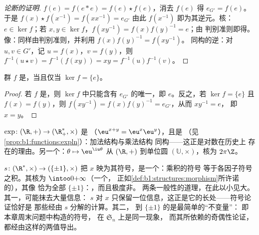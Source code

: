 \begin{proof}[论断的证明]
$f(e) = f(e * e) = f(e)\star f(e)$，消去 $f(e)$ 得
$e_{G'} = f(e)$。于是 $f(x)\star f(x^{-1}) = f(x x^{-1}) = e_{G'}$
由此 $f(x^{-1})$ 即为其逆元。核：$e \in \ker f$；若
$x, y \in \ker f$，$f(xy^{-1}) = f(x)f(y)^{-1} = e$；由
判别准则即得。像：同样由判别准则，并利用 $f(x)f(y)^{-1} = f(xy^{-1})$。
同构的逆：对 $u, v \in G'$，记 $u = f(x)$，$v =
f(y)$，则 $f^{-1}(u \star v) = f^{-1}(f(xy)) = xy =
f^{-1}(u) f^{-1}(v)$。
\end{proof}

\begin{proposition}[借助核判定单射性]\label{prop:b1:structures:kernel}
群 $f$ 是，当且仅当 $\ker f =
\{e\}$。
\end{proposition}

\begin{proof}
若 $f$ 是，则 $\ker f$ 中只能含有
$e_{G'}$ 的唯一，即 $e$。反之，若 $\ker f = \{e\}$ 且 $f(x) =
f(y)$，则 $f(xy^{-1}) = f(x) f(y)^{-1} = e_{G'}$，从而 $xy^{-1} = e$，
即 $x = y$。
\end{proof}

\begin{example}\label{ex:b1:structures:expmorphism}
$\exp \colon (\R, +) \to (\R_+^*, \times)$ 是
（$\eu^{x+y} = \eu^x \eu^y$），且是
（见\cref{prop:b1:functions:expln}）：加法结构与乘法结构
同构——这正是对数在历史上
存在的理由。另一个：$\theta \mapsto \eu^{\iu\theta}$ 从
$(\R, +)$ 到单位圆 $(\mathbb{U}, \times)$，核为
$2\pi\Z$。
\end{example}

\begin{example}[符号同态]\label{ex:b1:structures:signmorphism}
 $s \colon (\R^*, \times) \to (\{\pm1\}, \times)$ 把
$x$ 映为其符号，是一个：乘积的符号
等于各因子符号之积。其核为 $\intoo0{+\infty}$（一个，
正如\cref{def:b1:structures:morphism}所许诺的），其像
恰为全部 $\{\pm1\}$：，而且极度非。
两条一般性的道理，在此以小见大。其一，可能抹去大量信息：
$s$ 对 $x$ 只保留一位信息，这正是它的长处——符号论证恰好是
那些经由 $s$ 分解的计算。其二，
到 $\{\pm1\}$ 的是最简单的“不变量”：
即本章周末问题中构造的符号，
在 $\mathfrak S_n$ 上是同一现象，
而其所依赖的奇偶性论证，
都经由这样的两值导出。
\end{example}

